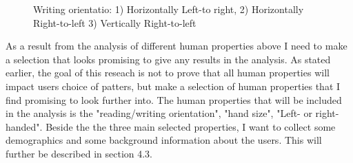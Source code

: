   \begin{figure}[H]
    \centering
    \caption{Writing orientatio: 1) Horizontally Left-to right, 2) Horizontally Right-to-left 3) Vertically Right-to-left}
  \end{figure}

  As a result from the analysis of different human properties above I need to make a selection that looks promising to give any results in the analysis. As stated earlier, the goal of this reseach is not to prove that all human properties will impact users choice of patters, but make a selection of human properties that I find promising to look further into. The human properties that will be included in the analysis is the  "reading/writing orientation", "hand size", "Left- or right-handed". 
  Beside the the three main selected properties, I want to collect some demographics and some background information about the users. This will further be described in section 4.3.

